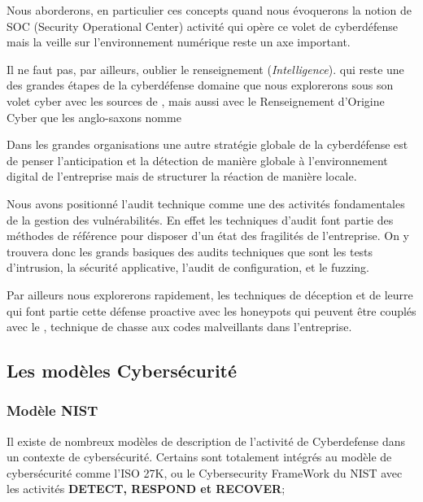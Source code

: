 Nous aborderons, en particulier ces concepts quand nous évoquerons la notion de SOC (Security Operational Center) activité qui opère ce volet de cyberdéfense mais la veille sur l'environnement numérique reste un axe important.



Il ne faut pas, par ailleurs, oublier le renseignement (\textit{Intelligence}). qui reste une des grandes étapes de la cyberdéfense domaine que nous explorerons sous son volet cyber avec les sources de , mais aussi avec le Renseignement d'Origine Cyber que les anglo-saxons nomme 

Dans les grandes organisations une autre stratégie globale de la cyberdéfense est de penser l'anticipation et la détection de manière globale à l'environnement digital de l'entreprise mais de structurer la réaction de manière locale. 


Nous avons positionné l'audit technique comme une des activités fondamentales de la gestion des vulnérabilités.
En effet les techniques d'audit font partie des méthodes de référence pour disposer d'un état des fragilités de l'entreprise. On y trouvera donc les grands basiques des audits techniques que sont les tests d'intrusion, la sécurité applicative, l'audit de configuration, et le fuzzing.

Par ailleurs nous explorerons rapidement, les techniques de déception et de leurre qui font partie cette défense proactive avec les honeypots qui peuvent être couplés avec le , technique de chasse aux codes malveillants dans l'entreprise.
 

\subsection{Les modèles Cybersécurité}

\begin{frame}
\frametitle<presentation>{Modèle NIST}

Il existe de nombreux modèles de description de l'activité de Cyberdefense dans un contexte de cybersécurité.
Certains sont totalement intégrés au modèle de cybersécurité comme l'ISO 27K, ou le Cybersecurity FrameWork du NIST  avec les activités \textbf{DETECT, RESPOND et RECOVER};
\end{frame}


